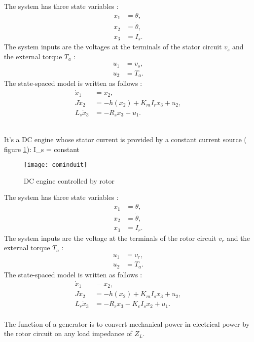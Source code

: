 \noindent The system has three state variables :
\begin{equation*} \begin{split}
x_1 &= \theta, \\
x_2 &= \dot{\theta}, \\
x_3 &= I_s. 
\end{split} \end{equation*}
The system inputs are the voltages at the terminals of the stator circuit $v_s$ and the external torque $T_a$ : 
\begin{equation*} \begin{split}
u_1 &= v_s, \\
u_2 &= T_a.
\end{split} \end{equation*}
The state-spaced model is written as follows :
\begin{equation*} \begin{split}
\dot x_1 &= x_2,\\
J\dot x_2 &= -h(x_2) + K_m I_r x_3 + u_2,\\
L_s\dot x_3 &= -R_s x_3 +u_1.
\end{split} \end{equation*}
\\

It's a DC engine whose stator current is provided by a constant current source ( figure \ref{fig:cominduit}):
\eqnn
I_s = constant
\eeqnn
\begin{figure}[htbp]
\begin{center}
\texttt{[image: cominduit]}
\caption{DC engine controlled by rotor}
\label{fig:cominduit}
\end{center}
\end{figure}
The system has three state variables :
\begin{equation*} \begin{split}
x_1 &= \theta, \\
x_2 &= \dot{\theta}, \\
x_3 &= I_r. 
\end{split} \end{equation*}
The system inputs are the voltage at the terminals of the rotor circuit $v_r$ and the external torque $T_a$ : 
\begin{equation*} \begin{split}
u_1 &= v_r, \\
u_2 &= T_a.
\end{split} \end{equation*}
The state-spaced model is written as follows :
\begin{equation*} \begin{split}
\dot x_1 &= x_2,\\
J\dot x_2 &= -h(x_2) + K_m I_s x_3 + u_2,\\
L_r\dot x_3 &= -R_r x_3 - K_e I_s x_2 + u_1.
\end{split} \end{equation*}
\\
The function of a generator is to convert mechanical power in electrical power  by the rotor circuit on any load impedance of $Z_L$.

